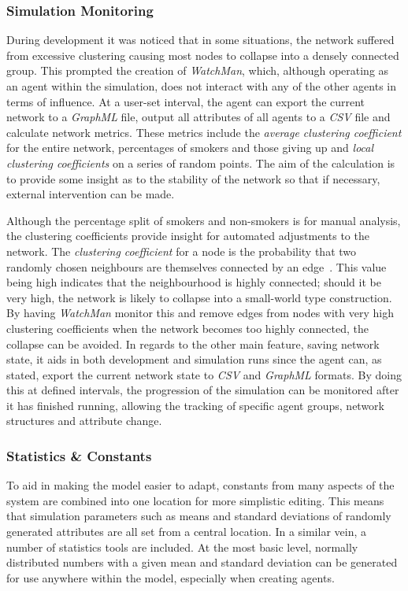 \documentclass[]{report}
\begin{document}
\subsubsection{Simulation Monitoring}
During development it was noticed that in some situations, the network suffered from excessive clustering causing most nodes to collapse into a densely connected group. This prompted the creation of \emph{WatchMan}, which, although operating as an agent within the simulation, does not interact with any of the other agents in terms of influence. At a user-set interval, the agent can export the current network to a \emph{GraphML} file, output all attributes of all agents to a \emph{CSV} file and calculate network metrics. These metrics include the \emph{average clustering coefficient} for the entire network, percentages of smokers and those giving up and \emph{local clustering coefficients} on a series of random points. The aim of the calculation is to provide some insight as to the stability of the network so that if necessary, external intervention can be made.

Although the percentage split of smokers and non-smokers is for manual analysis, the clustering coefficients provide insight for automated adjustments to the network. The \emph{clustering coefficient} for a node is the probability that two randomly chosen neighbours are themselves connected by an edge~\cite{NetMark-44-cluster}. This value being high indicates that the neighbourhood is highly connected; should it be very high, the network is likely to collapse into a small-world type construction. By having \emph{WatchMan} monitor this and remove edges from nodes with very high clustering coefficients when the network becomes too highly connected, the collapse can be avoided. In regards to the other main feature, saving network state, it aids in both development and simulation runs since the agent can, as stated, export the current network state to \emph{CSV} and \emph{GraphML} formats. By doing this at defined intervals, the progression of the simulation can be monitored after it has finished running, allowing the tracking of specific agent groups, network structures and attribute change. 

\subsubsection{Statistics \& Constants}
To aid in making the model easier to adapt, constants from many aspects of the system are combined into one location for more simplistic editing. This means that simulation parameters such as means and standard deviations of randomly generated attributes are all set from a central location. In a similar vein, a number of statistics tools are included. At the most basic level, normally distributed numbers with a given mean and standard deviation can be generated for use anywhere within the model, especially when creating agents.
\end{document}
